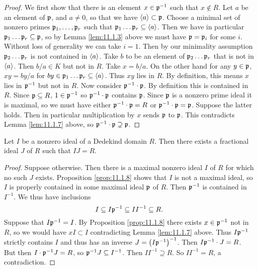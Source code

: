 \begin{proof}
We first show that there is an element $ x \in \mathfrak{p}^{-1} $ such that $ x \notin R $. Let $ a $ be an element of $ \mathfrak{p} $, and $ a \ne 0 $, so that we have $ \left\langle a \right\rangle \subset \mathfrak{p} $. Choose a minimal set of nonzero primes $ \mathfrak{p}_1, \dots, \mathfrak{p}_r $ such that $ \mathfrak{p}_1 \dots \mathfrak{p}_r \subseteq \left\langle a \right\rangle $. Then we have in particular $ \mathfrak{p}_1 \dots \mathfrak{p}_r \subseteq \mathfrak{p} $, so by Lemma \ref{lem:11.1.3} above we must have $ \mathfrak{p} = \mathfrak{p}_i $ for some $ i $. Without loss of generality we can take $ i = 1 $. Then by our minimality assumption $ \mathfrak{p}_2 \dots \mathfrak{p}_r $ is not contained in $ \left\langle a \right\rangle $. Take $ b $ to be an element of $ \mathfrak{p}_2 \dots \mathfrak{p}_r $ that is not in $ \left\langle a \right\rangle $. Then $ b / a \in K $ but not in $ R $. Take $ x = b / a $. On the other hand for any $ y \in \mathfrak{p} $, $ xy = by / a $ for $ by \in \mathfrak{p}_1 \dots \mathfrak{p}_r \subseteq \left\langle a \right\rangle $. Thus $ xy $ lies in $ R $. By definition, this means $ x $ lies in $ \mathfrak{p}^{-1} $ but not in $ R $. Now consider $ \mathfrak{p}^{-1} \cdot \mathfrak{p} $. By definition this is contained in $ R $. Since $ \mathfrak{p} \subseteq R $, $ 1 \in \mathfrak{p}^{-1} $ so $ \mathfrak{p}^{-1} \cdot \mathfrak{p} $ contains $ \mathfrak{p} $. Since $ \mathfrak{p} $ is a nonzero prime ideal it is maximal, so we must have either $ \mathfrak{p}^{-1} \cdot \mathfrak{p} = R $ or $ \mathfrak{p}^{-1} \cdot \mathfrak{p} = \mathfrak{p} $. Suppose the latter holds. Then in particular multiplication by $ x $ sends $ \mathfrak{p} $ to $ \mathfrak{p} $. This contradicts Lemma \ref{lem:11.1.7} above, so $ \mathfrak{p}^{-1} \cdot \mathfrak{p} \supsetneq \mathfrak{p} $.
\end{proof}

\begin{proposition}
\label{prop:11.1.9}
Let $ I $ be a nonzero ideal of a Dedekind domain $ R $. Then there exists a fractional ideal $ J $ of $ R $ such that $ IJ = R $.
\end{proposition}

\begin{proof}
Suppose otherwise. Then there is a maximal nonzero ideal $ I $ of $ R $ for which no such $ J $ exists. Proposition \ref{prop:11.1.8} shows that $ I $ is not a maximal ideal, so $ I $ is properly contained in some maximal ideal $ \mathfrak{p} $ of $ R $. Then $ \mathfrak{p}^{-1} $ is contained in $ I^{-1} $. We thus have inclusions
$$ I \subseteq I\mathfrak{p}^{-1} \subseteq II^{-1} \subseteq R. $$
Suppose that $ I\mathfrak{p}^{-1} = I $. By Proposition \ref{prop:11.1.8} there exists $ x \in \mathfrak{p}^{-1} $ not in $ R $, so we would have $ xI \subset I $ contradicting Lemma \ref{lem:11.1.7} above. Thus $ I\mathfrak{p}^{-1} $ strictly contains $ I $ and thus has an inverse $ J = \br{I\ppp^{-1}}^{-1} $. Then $ I\mathfrak{p}^{-1} \cdot J = R $. But then $ I \cdot \mathfrak{p}^{-1}J = R $, so $ \mathfrak{p}^{-1}J \subseteq I^{-1} $. Then $ II^{-1} \supseteq R $. So $ II^{-1} = R $, a contradiction.
\end{proof}

